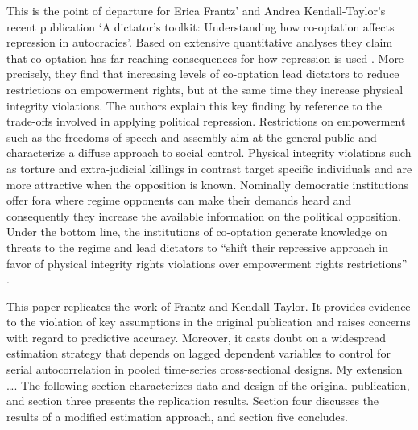 This is the point of departure for Erica Frantz' and Andrea 
Kendall-Taylor's \citeyearpar{Frantz.2014} recent publication 
`A dictator’s toolkit: Understanding how co-optation affects 
repression in autocracies'. Based on extensive quantitative 
analyses they claim that co-optation has far-reaching 
consequences for how repression is used 
\citep[332]{Frantz.2014}. More precisely, they find that 
increasing levels of co-optation lead dictators to reduce 
restrictions on empowerment rights, but at the same time 
they increase physical integrity violations. The authors 
explain this key finding by reference to the trade-offs 
involved in applying political repression. Restrictions on 
empowerment such as the freedoms of speech and assembly aim 
at the general public and characterize a diffuse approach to
social control. Physical integrity violations such as 
torture and extra-judicial killings in contrast target 
specific individuals and are more attractive when the 
opposition is known. Nominally democratic institutions offer
fora where regime opponents can make their demands heard and
consequently they increase the available information on the 
political opposition. Under the bottom line, the 
institutions of co-optation generate knowledge on threats to
the regime and lead dictators to ``shift their repressive 
approach in favor of physical integrity rights violations 
over empowerment rights restrictions'' 
\citep[337]{Frantz.2014}.

This paper replicates the work of Frantz and Kendall-Taylor.
It provides evidence to the violation of key assumptions in 
the original publication and raises concerns with regard to
predictive accuracy. Moreover, it casts doubt on a 
widespread estimation strategy that depends on lagged 
dependent variables to control for serial autocorrelation in
pooled time-series cross-sectional designs. My extension \dots.
The following section characterizes data and design of the 
original publication, and section three presents the 
replication results. Section four discusses the results of a
modified estimation approach, and section five concludes.
